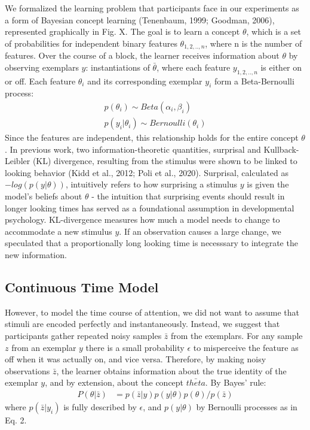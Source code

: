 \documentclass[10pt, letterpaper]{article}
\begin{document}
We formalized the learning problem that participants face in our
experiments as a form of Bayesian concept learning (Tenenbaum, 1999;
Goodman, 2006), represented graphically in Fig. X. The goal is to learn
a concept \(\theta\), which is a set of probabilities for independent
binary features \(\theta_{1,2,..,n}\), where n is the number of
features. Over the course of a block, the learner receives information
about \(\theta\) by observing exemplars \(y\): instantiations of
\(\bar{\theta}\), where each feature \(y_{1,2,..,n}\) is either on or
off. Each feature \(\theta_i\) and its corresponding exemplar \(y_i\)
form a Beta-Bernoulli process: \begin{eqnarray}
p(\theta_i) \sim Beta(\alpha_i,\beta_i) \\
p(y_i|\theta_i) \sim Bernoulli(\theta_i)
\end{eqnarray} Since the features are independent, this relationship
holds for the entire concept \(\theta\). In previous work, two
information-theoretic quantities, surprisal and Kullback-Leibler (KL)
divergence, resulting from the stimulus were shown to be linked to
looking behavior (Kidd et al., 2012; Poli et al., 2020). Surprisal,
calculated as \(-log(p(y|\theta))\), intuitively refers to how
surprising a stimulus \(y\) is given the model's beliefs about
\(\theta\) - the intuition that surprising events should result in
longer looking times has served as a foundational assumption in
developmental psychology. KL-divergence measures how much a model needs
to change to accommodate a new stimulus \(y\). If an observation causes
a large change, we speculated that a proportionally long looking time is
necesssary to integrate the new information.

\hypertarget{continuous-time-model}{%
\subsection{Continuous Time Model}\label{continuous-time-model}}

However, to model the time course of attention, we did not want to
assume that stimuli are encoded perfectly and instantaneously. Instead,
we suggest that participants gather repeated noisy samples \(\bar{z}\)
from the exemplars. For any sample \(z\) from an exemplar \(y\) there is
a small probability \(\epsilon\) to misperceive the feature as off when
it was actually on, and vice versa. Therefore, by making noisy
observations \(\bar{z}\), the learner obtains information about the true
identity of the exemplar \(y\), and by extension, about the concept
\(\bar{theta}\). By Bayes' rule: \begin{eqnarray}
P(\theta|\bar{z}) &= p(\bar{z}|y) p(y|\theta) p(\theta) / p(\bar{z})
\end{eqnarray} where \(p(\bar{z}|y_i)\) is fully described by
\(\epsilon\), and \(p(y|\theta)\) by Bernoulli processes as in Eq. 2.
\end{document}
